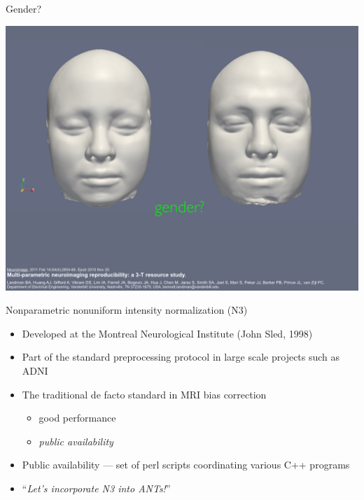 \documentclass[ignorenonframetext,]{beamer}
\providecommand{\tightlist}{%
  \setlength{\itemsep}{0pt}\setlength{\parskip}{0pt}}
\begin{document}
\begin{frame}{Gender?}

\includegraphics{./papers/figures/template5.jpg}

\end{frame}

\begin{frame}{Nonparametric nonuniform intensity normalization (N3)}

\begin{itemize}
\item
  Developed at the Montreal Neurological Institute (John Sled, 1998)
\item
  Part of the standard preprocessing protocol in large scale projects
  such as ADNI
\item
  The traditional de facto standard in MRI bias correction

  \begin{itemize}
  \tightlist
  \item
    good performance
  \item
    \emph{public availability}
  \end{itemize}
\item
  Public availability --- set of perl scripts coordinating various C++
  programs
\item
  ``\emph{Let's incorporate N3 into ANTs!}''
\end{itemize}

\end{frame}
\end{document}
